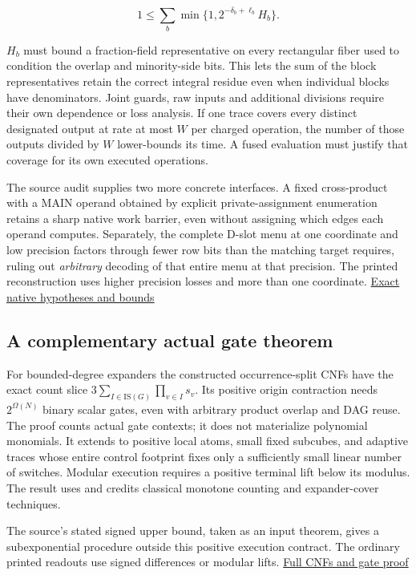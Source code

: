\documentclass[
  11pt,
]{article}
\begin{document}
\[
 1\le\sum_b\min\{1,2^{-\delta_b+\ell_b}H_b\}. \tag{U7}
\]

\(H_b\) must bound a fraction-field representative on every rectangular
fiber used to condition the overlap and minority-side bits. This lets
the sum of the block representatives retain the correct integral residue
even when individual blocks have denominators. Joint guards, raw inputs
and additional divisions require their own dependence or loss analysis.
If one trace covers every distinct designated output at rate at most
\(W\) per charged operation, the number of those outputs divided by
\(W\) lower-bounds its time. A fused evaluation must justify that
coverage for its own executed operations.

The source audit supplies two more concrete interfaces. A fixed
cross-product with a MAIN operand obtained by explicit
private-assignment enumeration retains a sharp native work barrier, even
without assigning which edges each operand computes. Separately, the
complete D-slot menu at one coordinate and low precision factors through
fewer row bits than the matching target requires, ruling out
\emph{arbitrary} decoding of that entire menu at that precision. The
printed reconstruction uses higher precision losses and more than one
coordinate. \hyperref[v8-section-native-escape]{Exact native hypotheses and
bounds}

\subsection{A complementary actual gate
theorem}\label{v8-a-complementary-actual-gate-theorem}

For bounded-degree expanders the constructed occurrence-split CNFs have
the exact count slice \(3\sum_{I\in\mathrm{IS}(G)}\prod_{v\in I}s_v\).
Its positive origin contraction needs \(2^{\Omega(N)}\) binary scalar
gates, even with arbitrary product overlap and DAG reuse. The proof
counts actual gate contexts; it does not materialize polynomial
monomials. It extends to positive local atoms, small fixed subcubes, and
adaptive traces whose entire control footprint fixes only a sufficiently
small linear number of switches. Modular execution requires a positive
terminal lift below its modulus. The result uses and credits classical
monotone counting and expander-cover techniques.

The source's stated signed upper bound, taken as an input theorem, gives
a subexponential procedure outside this positive execution contract. The
ordinary printed readouts use signed differences or modular lifts.
\hyperref[v8-section-stronger-family]{Full CNFs and gate proof}
\end{document}
